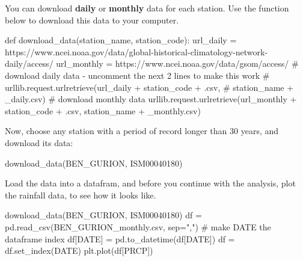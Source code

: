 \documentclass[
  letterpaper,
  DIV=11,
  numbers=noendperiod]{scrreprt}
\newenvironment{Shaded}{\begin{snugshade}}{\end{snugshade}}
\newcommand{\CommentTok}[1]{\textcolor[rgb]{0.37,0.37,0.37}{#1}}
\newcommand{\KeywordTok}[1]{\textcolor[rgb]{0.00,0.23,0.31}{#1}}
\newcommand{\NormalTok}[1]{\textcolor[rgb]{0.00,0.23,0.31}{#1}}
\newcommand{\OperatorTok}[1]{\textcolor[rgb]{0.37,0.37,0.37}{#1}}
\newcommand{\StringTok}[1]{\textcolor[rgb]{0.13,0.47,0.30}{#1}}
\begin{document}
You can download \textbf{daily} or \textbf{monthly} data for each
station. Use the function below to download this data to your computer.

\begin{Shaded}
\begin{Highlighting}[]
\KeywordTok{def}\NormalTok{ download\_data(station\_name, station\_code):}
\NormalTok{    url\_daily }\OperatorTok{=} \StringTok{\textquotesingle{}https://www.ncei.noaa.gov/data/global{-}historical{-}climatology{-}network{-}daily/access/\textquotesingle{}}
\NormalTok{    url\_monthly }\OperatorTok{=} \StringTok{\textquotesingle{}https://www.ncei.noaa.gov/data/gsom/access/\textquotesingle{}}
    \CommentTok{\# download daily data {-} uncomment the next 2 lines to make this work}
    \CommentTok{\# urllib.request.urlretrieve(url\_daily + station\_code + \textquotesingle{}.csv\textquotesingle{},}
    \CommentTok{\#                            station\_name + \textquotesingle{}\_daily.csv\textquotesingle{})}
    \CommentTok{\# download monthly data}
\NormalTok{    urllib.request.urlretrieve(url\_monthly }\OperatorTok{+}\NormalTok{ station\_code }\OperatorTok{+} \StringTok{\textquotesingle{}.csv\textquotesingle{}}\NormalTok{,}
\NormalTok{                               station\_name }\OperatorTok{+} \StringTok{\textquotesingle{}\_monthly.csv\textquotesingle{}}\NormalTok{)}
\end{Highlighting}
\end{Shaded}

Now, choose any station with a period of record longer than 30 years,
and download its data:

\begin{Shaded}
\begin{Highlighting}[]
\NormalTok{download\_data(}\StringTok{\textquotesingle{}BEN\_GURION\textquotesingle{}}\NormalTok{, }\StringTok{\textquotesingle{}ISM00040180\textquotesingle{}}\NormalTok{)}
\end{Highlighting}
\end{Shaded}

Load the data into a datafram, and before you continue with the
analysis, plot the rainfall data, to see how it looks like.

\begin{Shaded}
\begin{Highlighting}[]
\NormalTok{download\_data(}\StringTok{\textquotesingle{}BEN\_GURION\textquotesingle{}}\NormalTok{, }\StringTok{\textquotesingle{}ISM00040180\textquotesingle{}}\NormalTok{)}
\NormalTok{df }\OperatorTok{=}\NormalTok{ pd.read\_csv(}\StringTok{\textquotesingle{}BEN\_GURION\_monthly.csv\textquotesingle{}}\NormalTok{, sep}\OperatorTok{=}\StringTok{","}\NormalTok{)}
\CommentTok{\# make \textquotesingle{}DATE\textquotesingle{} the dataframe index}
\NormalTok{df[}\StringTok{\textquotesingle{}DATE\textquotesingle{}}\NormalTok{] }\OperatorTok{=}\NormalTok{ pd.to\_datetime(df[}\StringTok{\textquotesingle{}DATE\textquotesingle{}}\NormalTok{])}
\NormalTok{df }\OperatorTok{=}\NormalTok{ df.set\_index(}\StringTok{\textquotesingle{}DATE\textquotesingle{}}\NormalTok{)}
\NormalTok{plt.plot(df[}\StringTok{\textquotesingle{}PRCP\textquotesingle{}}\NormalTok{])}
\end{Highlighting}
\end{Shaded}
\end{document}
